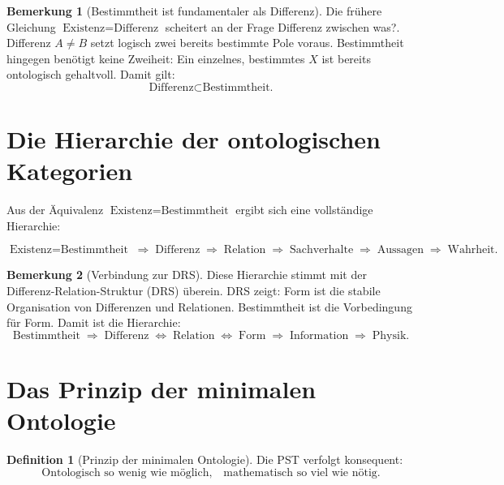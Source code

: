 \documentclass[11pt,a4paper]{article}
\theoremstyle{plain}
\theoremstyle{definition}
\newtheorem{definition}{Definition}[section]
\newtheorem{remark}{Bemerkung}[section]
\begin{document}
\begin{remark}[Bestimmtheit ist fundamentaler als Differenz]
Die fr\"{u}here Gleichung $\text{Existenz} = \text{Differenz}$ scheitert
an der Frage \glqq{}Differenz zwischen was?\grqq{}. Differenz $A \neq B$
setzt logisch zwei bereits bestimmte Pole voraus. Bestimmtheit hingegen
ben\"{o}tigt keine Zweiheit: Ein einzelnes, bestimmtes $X$ ist bereits
ontologisch gehaltvoll. Damit gilt:
\[
  \text{Differenz} \subset \text{Bestimmtheit.}
\]
\end{remark}

\section{Die Hierarchie der ontologischen Kategorien}

Aus der \"{A}quivalenz $\text{Existenz} = \text{Bestimmtheit}$ ergibt
sich eine vollst\"{a}ndige Hierarchie:

\[
  \boxed{\text{Existenz} = \text{Bestimmtheit}}
  \;\Longrightarrow\;
  \text{Differenz}
  \;\Longrightarrow\;
  \text{Relation}
  \;\Longrightarrow\;
  \text{Sachverhalte}
  \;\Longrightarrow\;
  \text{Aussagen}
  \;\Longrightarrow\;
  \text{Wahrheit.}
\]

\begin{remark}[Verbindung zur DRS]
Diese Hierarchie stimmt mit der Differenz-Relation-Struktur (DRS) \"{u}berein.
DRS zeigt: Form ist die stabile Organisation von Differenzen und Relationen.
Bestimmtheit ist die Vorbedingung f\"{u}r Form. Damit ist die Hierarchie:
\[
  \text{Bestimmtheit}
  \;\Longrightarrow\;
  \text{Differenz} \;\Longleftrightarrow\; \text{Relation}
  \;\Longleftrightarrow\; \text{Form}
  \;\Longrightarrow\;
  \text{Information}
  \;\Longrightarrow\;
  \text{Physik.}
\]
\end{remark}

\section{Das Prinzip der minimalen Ontologie}

\begin{definition}[Prinzip der minimalen Ontologie]
Die PST verfolgt konsequent:
\[
  \boxed{
    \text{Ontologisch so wenig wie m\"{o}glich,}
    \quad
    \text{mathematisch so viel wie n\"{o}tig.}
  }
\]
\end{definition}
\end{document}
